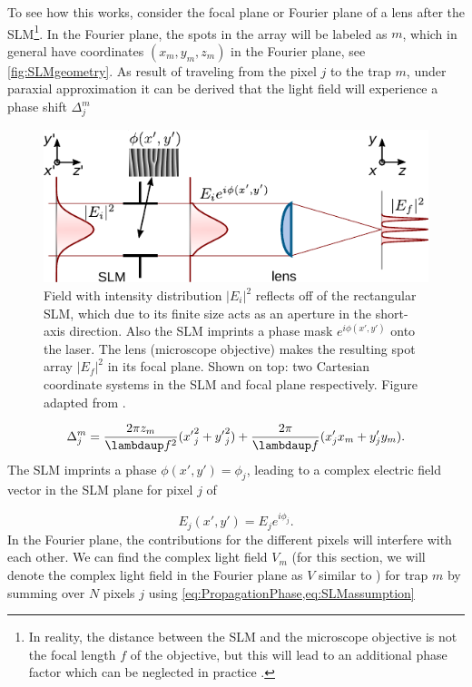 To see how this works, consider the focal plane or Fourier plane of a lens after the SLM\footnote{In reality, the distance between the SLM and the microscope objective is not the focal length $f$ of the objective, but this will lead to an additional phase factor which can be neglected in practice \cite{Bijnen2013}.}.
In the Fourier plane, the spots in the array will be labeled as $m$, which in general have coordinates $(x_m, y_m, z_m)$ in the Fourier plane, see \cref{fig:SLMgeometry}.
As result of traveling from the pixel $j$ to the trap $m$, under paraxial approximation it can be derived that the light field will experience a phase shift $\Delta_j^m$ \cite{DiLeonardo2007}

\begin{figure}
	\centering
	\includegraphics[width = 13cm]{figures/SLMfigure.pdf}
	\caption{Field with intensity distribution $|E_i|^2$ reflects off of the   rectangular SLM, which due to its finite size acts as an aperture in the short-axis direction.
	Also the SLM imprints a phase mask $e^{i\phi(x',y')}$ onto the laser.
	The lens (microscope objective) makes the resulting spot array $|E_f|^2$ in its focal plane.
	Shown on top: two Cartesian coordinate systems in the SLM and focal plane respectively. 
	Figure adapted from \cite{Labuhn2016}.}
	\label{fig:SLMLens}
\end{figure}

\begin{equation}\label{eq:PropagationPhase}
    \Delta_j^m = 
    \frac{2\pi z_m}{\lambdaup f^2} ({x'}_{j}^{2} + {y'}_{j}^{2}) 
    + \frac{2\pi}{\lambdaup f}(x'_j x_m + y'_j y_m).
\end{equation}
The SLM imprints a phase $\phi(x',y') = \phi_j$, leading to a complex electric field vector in the SLM plane for pixel $j$ of

\begin{equation}\label{eq:SLMassumption}
    E_j(x',y') = E_j e^{i \phi_j}.
\end{equation}
In the Fourier plane, the contributions for the different pixels will interfere with each other.
We can find the complex light field $V_m$ (for this section, we will denote the complex light field in the Fourier plane as $V$ similar to \cite{DiLeonardo2007}) for trap $m$ by summing over $N$ pixels $j$ using \cref{eq:PropagationPhase,eq:SLMassumption} \cite{Leseleuc2018}

